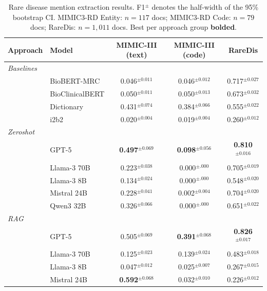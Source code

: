 \begin{table}[t]
\centering\small\setlength{\tabcolsep}{4pt}
\caption{Rare disease mention extraction results. F1$^{\pm}$ denotes the half-width of the 95\% bootstrap CI.
MIMIC3-RD Entity: $n{=}117$ docs; MIMIC3-RD Code: $n{=}79$ docs; RareDis: $n{=}1{,}011$ docs.
Best per approach group \textbf{bolded}.}
\label{tab:raredis_ci}
\begin{tabular}{llccc}
\toprule
\textbf{Approach} & \textbf{Model} & \textbf{MIMIC-III (text)} & \textbf{MIMIC-III (code)} & \textbf{RareDis} \\
\midrule
\multicolumn{5}{l}{\textit{Baselines}} \\
& BioBERT-MRC & 0.046$^{\pm0.011}$ & 0.046$^{\pm0.012}$ & 0.717$^{\pm0.027}$ \\
& BioClinicalBERT & 0.050$^{\pm0.011}$ & 0.050$^{\pm0.013}$ & 0.673$^{\pm0.032}$ \\
& Dictionary & 0.431$^{\pm0.074}$ & 0.384$^{\pm0.066}$ & 0.555$^{\pm0.022}$ \\
& i2b2 & 0.020$^{\pm0.004}$ & 0.019$^{\pm0.004}$ & 0.260$^{\pm0.012}$ \\
\midrule
\multicolumn{5}{l}{\textit{Zeroshot}} \\
& GPT-5 & \textbf{0.497}$^{\pm0.069}$ & \textbf{0.098}$^{\pm0.056}$ & \textbf{0.810}$^{\pm0.016}$ \\
& Llama-3 70B & 0.223$^{\pm0.038}$ & 0.000$^{\pm.000}$ & 0.705$^{\pm0.019}$ \\
& Llama-3 8B & 0.134$^{\pm0.024}$ & 0.000$^{\pm.000}$ & 0.548$^{\pm0.020}$ \\
& Mistral 24B & 0.228$^{\pm0.041}$ & 0.002$^{\pm0.004}$ & 0.704$^{\pm0.020}$ \\
& Qwen3 32B & 0.326$^{\pm0.066}$ & 0.000$^{\pm.000}$ & 0.651$^{\pm0.022}$ \\
\midrule
\multicolumn{5}{l}{\textit{RAG}} \\
& GPT-5 & 0.505$^{\pm0.069}$ & \textbf{0.391}$^{\pm0.068}$ & \textbf{0.826}$^{\pm0.017}$ \\
& Llama-3 70B & 0.125$^{\pm0.023}$ & 0.139$^{\pm0.024}$ & 0.483$^{\pm0.018}$ \\
& Llama-3 8B & 0.047$^{\pm0.012}$ & 0.025$^{\pm0.007}$ & 0.267$^{\pm0.015}$ \\
& Mistral 24B & \textbf{0.592}$^{\pm0.068}$ & 0.032$^{\pm0.010}$ & 0.226$^{\pm0.012}$ \\

\end{tabular}
\end{table}
